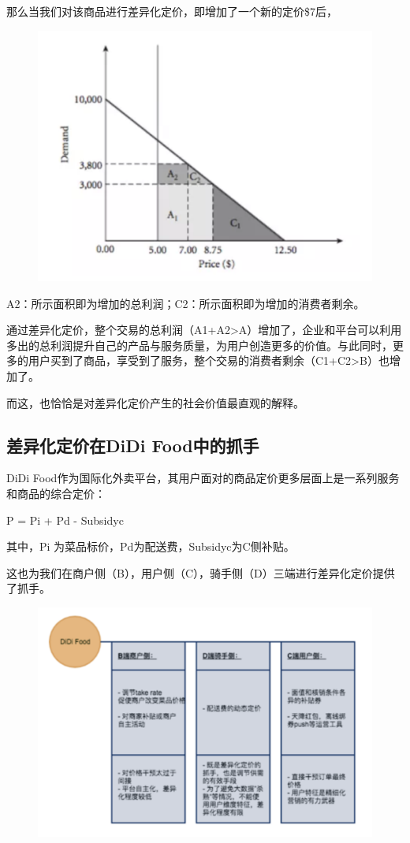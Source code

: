 \documentclass[12pt]{article}
\begin{document}
那么当我们对该商品进行差异化定价，即增加了一个新的定价\$7后，
\begin{figure}[H]
    \centering
    \includegraphics[width=.6\textwidth]{fig/Causal_Inference_In_DiDi_2.png}
\end{figure}
A2：所示面积即为增加的总利润；C2：所示面积即为增加的消费者剩余。

通过差异化定价，整个交易的总利润（A1+A2>A）增加了，企业和平台可以利用多出的总利润提升自己的产品与服务质量，为用户创造更多的价值。与此同时，更多的用户买到了商品，享受到了服务，整个交易的消费者剩余（C1+C2>B）也增加了。

而这，也恰恰是对差异化定价产生的社会价值最直观的解释。

\subsection{差异化定价在DiDi Food中的抓手}
DiDi Food作为国际化外卖平台，其用户面对的商品定价更多层面上是一系列服务和商品的综合定价：

P = Pi + Pd - Subsidyc

其中，Pi 为菜品标价，Pd为配送费，Subsidyc为C侧补贴。

这也为我们在商户侧（B），用户侧（C），骑手侧（D）三端进行差异化定价提供了抓手。
\begin{figure}[H]
    \centering
    \includegraphics[width=.6\textwidth]{fig/Causal_Inference_In_DiDi_3.png}
\end{figure}
\end{document}
